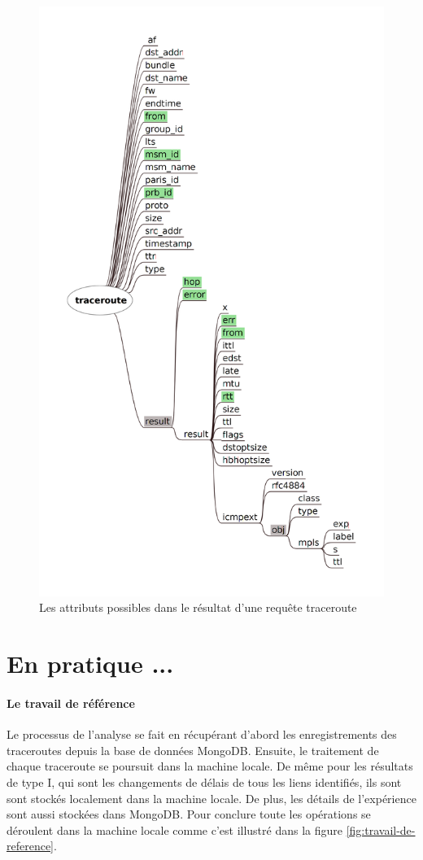 \begin{figure}[H]
\centering
\includegraphics[width=0.7\linewidth]{illustrations/traceroute_attributes}
\caption{Les attributs possibles dans le résultat d'une requête traceroute}
\label{fig:traceroute_attributes}
\end{figure}



\section{En pratique ...}

\paragraph{Le travail de référence}

Le processus de l'analyse se fait en récupérant  d'abord les enregistrements des traceroutes depuis la base de données MongoDB. Ensuite, le traitement de chaque traceroute se poursuit dans la machine locale. De même pour les résultats de type I, qui sont les changements de délais de tous les liens identifiés, ils sont sont stockés localement dans la machine locale.
De plus, les détails de l'expérience sont aussi stockées dans MongoDB. Pour conclure toute les opérations se déroulent dans la machine locale comme c'est illustré dans la figure \ref{fig:travail-de-reference}.

